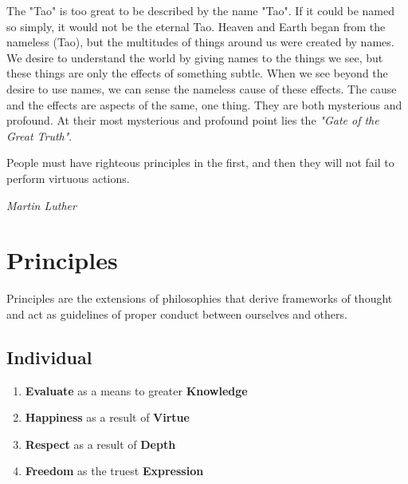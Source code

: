 \documentclass[11pt]{article}
\begin{document}
\noindent
\vspace{-10pt}
\begin{flushright}
The "Tao" is too great to be described by the name "Tao".
If it could be named so simply, it would not be the eternal Tao.\vspace{10pt}\linebreak
Heaven and Earth began from the nameless (Tao),
but the multitudes of things around us were created by names.\vspace{10pt}\linebreak
We desire to understand the world by giving names to the things we see, but these things are only the effects of something subtle.\vspace{10pt}\linebreak
When we see beyond the desire to use names, we can sense the nameless cause of these effects. \vspace{10pt}\linebreak
The cause and the effects are aspects of the same, one thing.
They are both mysterious and profound.\vspace{20pt}\linebreak
At their most mysterious and profound point lies the \textit{"Gate of the Great Truth"}.
\end{flushright}

\epigraph{People must have righteous principles in the first, and then they will not fail to perform virtuous actions.}{\textit{\footnotesize{Martin Luther}}}

\section{Principles}

Principles are the extensions of philosophies that derive frameworks of thought and act as guidelines of proper conduct between ourselves and others.

\subsection{Individual}

\begin{enumerate}
\item \textbf{Evaluate} as a means to greater \textbf{Knowledge}
\item \textbf{Happiness} as a result of \textbf{Virtue}
\item \textbf{Respect} as a result of \textbf{Depth}
\item \textbf{Freedom} as the truest \textbf{Expression}
\end{enumerate}
\end{document}
